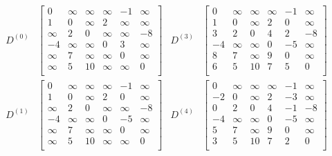 \documentclass[]{memoir}
\begin{document}
\begin{enumerate}
\begin{align*}
D^{(0)} & \begin{bmatrix}
	0 & \infty & \infty & \infty & -1 & \infty \\
	1 & 0 & \infty & 2 & \infty & \infty \\
	\infty & 2 & 0 & \infty & \infty & -8 \\
	-4 & \infty & \infty & 0 & 3 & \infty  \\
	\infty & 7 & \infty & \infty & 0 & \infty \\
	\infty & 5 & 10 & \infty & \infty & 0 \\ 
\end{bmatrix}
&
D^{(3)} & \begin{bmatrix}
	0 & \infty & \infty & \infty & -1 & \infty \\
	1 & 0 & \infty & 2 & 0 & \infty \\
	3 & 2 & 0 & 4 & 2 & -8 \\
	-4 & \infty & \infty & 0 & -5 & \infty  \\
	8 & 7 & \infty & 9 & 0 & \infty \\
	6 & 5 & 10 & 7 & 5 & 0 \\ 
\end{bmatrix}
\end{align*}
\begin{align*}
D^{(1)} & \begin{bmatrix}
	0 & \infty & \infty & \infty & -1 & \infty \\
	1 & 0 & \infty & 2 & 0 & \infty \\
	\infty & 2 & 0 & \infty & \infty & -8 \\
	-4 & \infty & \infty & 0 & -5 & \infty  \\
	\infty & 7 & \infty & \infty & 0 & \infty \\
	\infty & 5 & 10 & \infty & \infty & 0 \\ 
\end{bmatrix}
&
D^{(4)} & \begin{bmatrix}
	0 & \infty & \infty & \infty & -1 & \infty \\
	-2 & 0 & \infty & 2 & -3 & \infty \\
	0 & 2 & 0 & 4 & -1 & -8 \\
	-4 & \infty & \infty & 0 & -5 & \infty  \\
	5 & 7 & \infty & 9 & 0 & \infty \\
	3 & 5 & 10 & 7 & 2 & 0 \\ 
\end{bmatrix}
\end{align*}

\end{enumerate}
\end{document}
